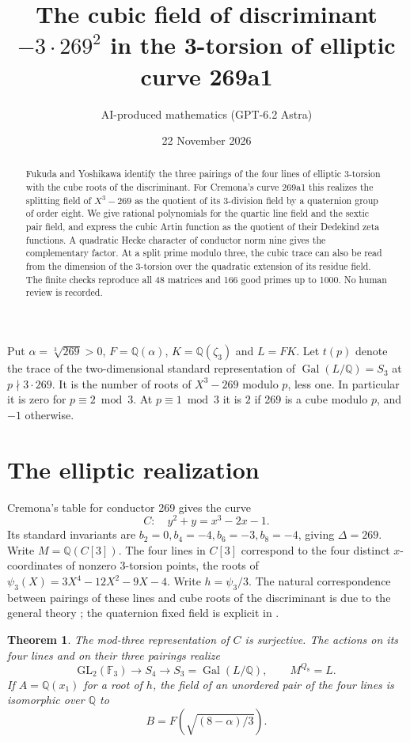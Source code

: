 \documentclass[11pt]{article}
\title{The cubic field of discriminant \(-3\cdot269^2\) in the 3-torsion of elliptic curve 269a1}
\author{AI-produced mathematics (GPT-6.2 Astra)}
\date{22 November 2026}
\newtheorem{theorem}{Theorem}
\newcommand{\Q}{\mathbb Q}
\newcommand{\F}{\mathbb F}
\newcommand{\Gal}{\operatorname{Gal}}
\begin{document}
\maketitle
\begin{abstract}
Fukuda and Yoshikawa identify the three pairings of the four lines of elliptic
3-torsion with the cube roots of the discriminant. For Cremona's curve 269a1
this realizes the splitting field of \(X^3-269\) as the quotient of its
3-division field by a quaternion group of order eight. We give rational
polynomials for the quartic line field and the sextic pair field, and express
the cubic Artin function as the quotient of their Dedekind zeta functions.
A quadratic Hecke character of conductor norm nine gives the complementary
factor. At a split prime modulo three, the cubic trace can also be read from
the dimension of the 3-torsion over the quadratic extension of its residue
field. The finite checks reproduce all 48 matrices and 166 good primes up
to 1000. No human review is recorded.
\end{abstract}

Put \(\alpha=\sqrt[3]{269}>0\), \(F=\Q(\alpha)\), \(K=\Q(\zeta_3)\) and
\(L=FK\). Let \(t(p)\) denote the trace of the two-dimensional standard
representation of \(\Gal(L/\Q)=S_3\) at \(p\nmid3\cdot269\).
It is the number of roots of \(X^3-269\) modulo \(p\), less one. In particular
it is zero for \(p\equiv2\bmod3\). At \(p\equiv1\bmod3\) it is \(2\) if 269
is a cube modulo \(p\), and \(-1\) otherwise.

\section{The elliptic realization}
Cremona's table for conductor 269 gives the curve
\[
 C:\quad y^2+y=x^3-2x-1.
\]
Its standard invariants are \(b_2=0,b_4=-4,b_6=-3,b_8=-4\), giving
\(\Delta=269\). Write \(M=\Q(C[3])\). The four lines in \(C[3]\) correspond
to the four distinct \(x\)-coordinates of nonzero 3-torsion points, the roots
of \(\psi_3(X)=3X^4-12X^2-9X-4\). Write \(h=\psi_3/3\).
The natural correspondence between pairings of these lines and cube roots of
the discriminant is due to the general theory
\cite[\S\S3.1,4.1]{FY}; the quaternion fixed field is explicit in
\cite[Lemmas 6.3.2--3]{Bisatt}.

\begin{theorem}\label{group}
The mod-three representation of \(C\) is surjective. The actions on its
four lines and on their three pairings realize
\[
 \mathrm{GL}_2(\F_3)\longrightarrow S_4\longrightarrow S_3
       =\Gal(L/\Q),\qquad M^{Q_8}=L .
\]
If \(A=\Q(x_1)\) for a root of \(h\), the field of an unordered pair of the
four lines is isomorphic over \(\Q\) to
\[
 B=F\left(\sqrt{(8-\alpha)/3}\right).
\]
\end{theorem}
\end{document}
